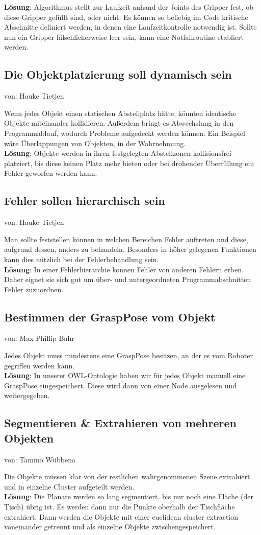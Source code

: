 \documentclass{suturo}
\makeatletter
\newcommand{\chapterauthor}[1]{%
  {\parindent0pt\vspace*{-27pt}%
  \linespread{0}\small\begin{flushright}von: #1\end{flushright}%
  \par\nobreak\vspace*{0pt}}
  \@afterheading%
}
\makeatother
\begin{document}
\textbf{Lösung}: Algorithmus stellt zur Laufzeit anhand der Joints des Gripper fest, ob diese Gripper gefüllt sind, oder nicht. Es können so beliebig im Code kritische Abschnitte definiert werden, in denen eine Laufzeitkontrolle notwendig ist. Sollte nun ein Gripper fälschlicherweise leer sein, kann eine Notfallroutine etabliert werden.

\subsection{Die Objektplatzierung soll dynamisch sein}
\chapterauthor{Hauke Tietjen}
Wenn jedes Objekt einen statischen Abstellplatz hätte, könnten identische Objekte miteinander kollidieren. Außerdem bringt es Abwechslung in den Programmablauf, wodurch Probleme aufgedeckt werden können. Ein Beispiel wäre Überlappungen von Objekten, in der Wahrnehmung. \\

\textbf{Lösung}: Objekte werden in ihren festgelegten Abstellzonen kollisionsfrei platziert, bis diese keinen Platz mehr bieten oder bei drohender Überfüllung ein Fehler geworfen werden kann.


\subsection{Fehler sollen hierarchisch sein}
\chapterauthor{Hauke Tietjen}
Man sollte feststellen können in welchen Bereichen Fehler auftreten und diese, aufgrund dessen, anders zu behandeln. Besonders in höher gelegenen Funktionen kann dies nützlich bei der Fehlerbehandlung sein. \\

\textbf{Lösung}: In einer Fehlerhierarchie können Fehler von anderen Fehlern erben. Daher eignet sie sich gut um über- und untergeordneten Programmabschnitten Fehler zuzuordnen.

\subsection{Bestimmen der GraspPose vom Objekt}
\chapterauthor{Max-Phillip Bahr}
Jedes Objekt muss mindestens eine GraspPose besitzen, an der es vom Roboter gegriffen werden kann.\\

\textbf{Lösung}: In unserer OWL-Ontologie haben wir für jedes Objekt manuell eine GraspPose eingespeichert. Diese wird dann von einer Node ausgelesen und weitergegeben.

\subsection{Segmentieren \& Extrahieren von mehreren Objekten}
\chapterauthor{Tammo Wübbena}
Die Objekte müssen klar von der restlichen wahrgenommenen Szene extrahiert und in einzelne Cluster aufgeteilt werden.\\
\textbf{Lösung}: Die Planare werden so lang segmentiert, bis nur noch eine Fläche (der Tisch) übrig ist. Es werden dann nur die Punkte oberhalb der Tischfläche extrahiert. Dann werden die Objekte mit einer euclidean cluster extraction voneinander getrennt und als einzelne Objekte zwischengespeichert.
\end{document}

